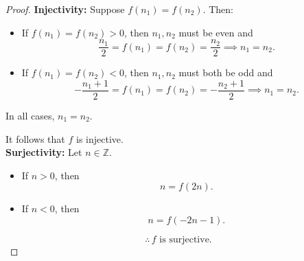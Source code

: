 \documentclass[11pt]{article}
\begin{document}
\begin{proof}
    \textbf{Injectivity:} Suppose $f(n_1) = f(n_2)$. Then:
    \begin{itemize}
        \item If $f(n_1) = f(n_2) > 0$, then $n_1, n_2$ must be even and
              \[
                  \frac{n_1}{2} = f(n_1) = f(n_2) = \frac{n_2}{2} \implies n_1 = n_2.
              \]

        \item If $f(n_1) = f(n_2) < 0$, then $n_1, n_2$ must both be odd and
              \[
                  -\frac{n_1 + 1}{2} = f(n_1) = f(n_2) = -\frac{n_2 + 1}{2} \implies n_1 = n_2.
              \]
    \end{itemize}

    In all cases, $n_1 = n_2$.

    It follows that $f$ is injective. \\ \textbf{Surjectivity:} Let $n \in
        \mathbb{Z}$.

    \begin{itemize}
        \item If $n > 0$, then
              \[
                  n = f(2n).
              \]
        \item If $n < 0$, then
              \[
                  n = f(-2n - 1).
              \]
    \end{itemize}

    \[
        \therefore \, f \text{ is surjective.}
    \]
\end{proof}
\end{document}
